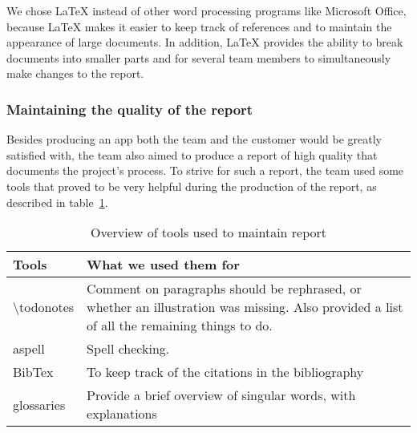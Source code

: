 We chose LaTeX instead of other word processing programs like Microsoft Office, because LaTeX makes it easier to keep track of references and to maintain the appearance of large
documents. In addition, LaTeX provides the ability to break documents into smaller parts and for several team members to simultaneously make changes to the report.

\subsubsection{Maintaining the quality of the report}
Besides producing an app both the team and the customer would be greatly satisfied with, the team also aimed to produce a report of high quality that documents the project's process. To strive for such a report, the team used some tools that proved to be very helpful during the production of the report, as described in table~\ref{tab:reportTools}.

\begin{table}[H]
\begin{tabular}{|l|p{13.7cm}|}
\hline
\textbf{Tools} & \textbf{What we used them for}\\\hline
\textbackslash todonotes&Comment on paragraphs should be rephrased, or whether an illustration was missing. Also provided a list of all the remaining things to do.\\\hline
aspell & Spell checking.\\\hline
BibTex&To keep track of the citations in the bibliography\\\hline
glossaries& Provide a brief overview of singular words, with explanations\\\hline
\end{tabular}
\caption{Overview of tools used to maintain report}
\label{tab:reportTools}
\end{table}

